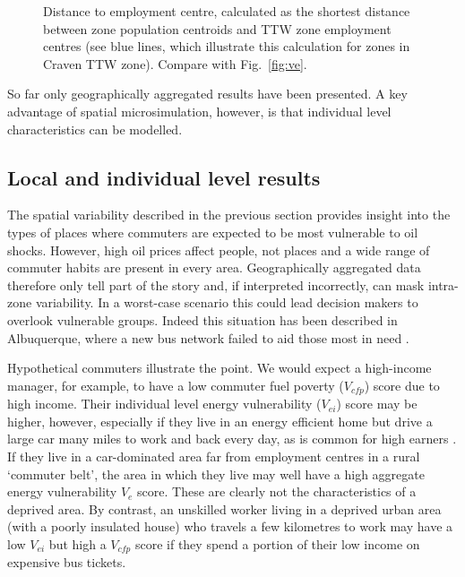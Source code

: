 \begin{figure}[h]
 \centering
 \caption[Distance to employment centre from zone centroids]{Distance to
employment centre, calculated as the shortest distance
between zone population centroids and TTW zone employment centres (see
blue lines, which illustrate this calculation for zones in Craven TTW zone).
 Compare with Fig.~\ref{fig:ve}.}
 \label{fig:mapttw}
\end{figure}

So far only geographically aggregated results have been presented.
A key advantage of spatial microsimulation, however, is that individual level
characteristics can be modelled.

\subsection{Local and individual level results}
\label{s:indresults}
The spatial variability described in the previous section
provides insight into the types of places
where commuters are expected to be most vulnerable to oil shocks.
However, high oil prices affect people, not places and a wide range of
commuter habits are present in every area. Geographically
aggregated data therefore only tell part of the story and, if
interpreted incorrectly, can mask intra-zone variability.
In a worst-case scenario this could lead decision makers to
overlook vulnerable groups. Indeed this situation has been described
in Albuquerque, where a new bus network failed to
aid those most in need \citep{Tribby2012}.

Hypothetical commuters illustrate the point. We would expect a
high-income manager, for example, to have a low commuter fuel poverty
($V_{cfp}$)
score due to high income. Their individual level energy vulnerability ($V_{ei}$)
score may be higher, however,
especially if they live in an energy efficient home but drive a large car
many miles to work and back every day, as is common for high earners
\citep{Green-1999-ld-commute}. If they live in a car-dominated area far from
employment centres in a rural `commuter belt', the area in which they live
may well have a high aggregate energy vulnerability $V_e$ score. These
are clearly not the characteristics of a deprived area.
By contrast, an unskilled worker living in a deprived urban area (with a poorly
insulated house) who travels a few kilometres to work may have a low
$V_{ei}$ but high a $V_{cfp}$ score if they spend
a portion of their low income on expensive bus tickets.

